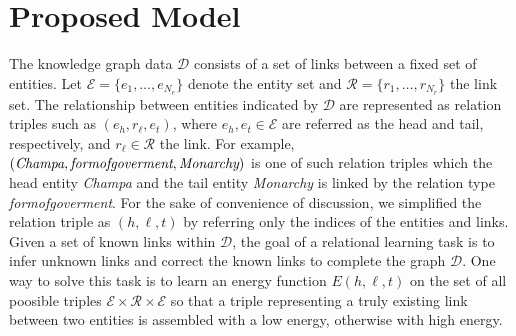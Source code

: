 \documentclass[10pt,journal]{IEEEtran}
\begin{document}
\section{Proposed Model}
The knowledge graph data $\mathcal{D}$ consists of a set of links between a fixed set of entities. Let $\mathcal{E} = \{e_1, \ldots, e_{N_e}\}$ denote the entity set and $\mathcal{R} = \{r_1, \ldots, r_{N_r}\}$ the link set.  The relationship between entities indicated by $\mathcal{D}$ are represented as relation triples such as $(e_h,r_{\ell},e_t)$, where $e_h, e_t\in \mathcal{E}$ are referred as the head  and tail, respectively, and  $r_{\ell} \in \mathcal{R}$ the link.  For example, $(\emph{Champa}, \emph{formofgoverment}, \emph{Monarchy})$ is one of such relation triples which the head entity \emph{Champa} and the tail entity \emph{Monarchy} is linked by the relation type \emph{formofgoverment}.  For the sake of convenience of discussion, we simplified the relation triple as $(h,\ell, t)$   by referring only the indices of the entities and links. Given a set of known links within $\mathcal{D}$, the goal of a relational learning task is to  infer unknown links and correct the known links to complete the graph $\mathcal{D}$. One way to solve this task is to learn an energy function $E(h, \ell, t)$ on the set of all poosible triples $\mathcal{E} \times \mathcal{R} \times \mathcal{E}$ so that a triple representing a truly existing link between two entities  is assembled with a low energy, otherwise with high energy. 

\end{document}
